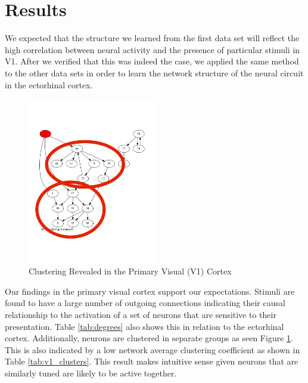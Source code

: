 \documentclass{article}
\begin{document}
\section{Results}
 
We expected that the structure we learned from the first data set will reflect 
the high correlation between neural activity and the presence of particular 
stimuli in V1. After we verified that this was indeed the case, we applied the 
same method to the other data sets in order to learn the network structure of 
the neural circuit in the ectorhinal cortex. \par

\begin{figure}[ht]
  \centering

  \includegraphics[width=0.5\textwidth]{v1_clusters}
  \caption{Clustering Revealed in the Primary Visual (V1) Cortex}
  \label{fig:v1_clusters}
\end{figure}

Our findings in the primary visual cortex support our expectations. Stimuli 
are found to have a large number of outgoing connections indicating their 
causal relationship to the activation of a set of neurons that are sensitive 
to their presentation. Table \ref{tab:degrees} also shows this in relation to 
the ectorhinal cortex. Additionally, neurons are clustered in separate groups 
as seen Figure \ref{fig:v1_clusters}. This is also indicated by a low network 
average clustering coefficient as shown in Table \ref{tab:v1_clusters}. This 
result makes intuitive sense given neurons that are similarly tuned are likely 
to be active together. \par 
\end{document}
